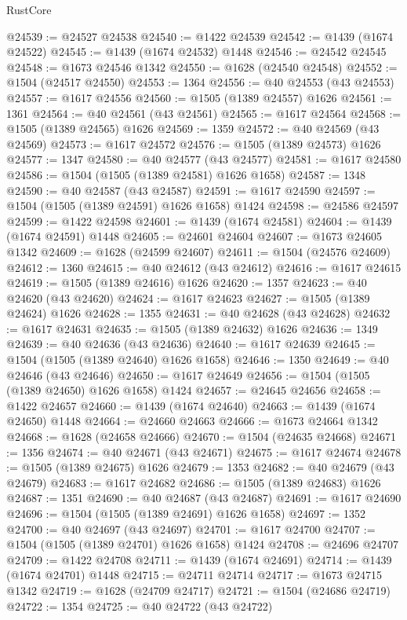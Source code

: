 \begin{lexlean}{RustCore}
\begin{coremodule}
@24539 := @24527 @24538
@24540 := @1422 @24539
@24542 := @1439 (@1674 @24522)
@24545 := @1439 (@1674 @24532) @1448
@24546 := @24542 @24545
@24548 := @1673 @24546 @1342
@24550 := @1628 (@24540 @24548)
@24552 := @1504 (@24517 @24550)
@24553 := 1364
@24556 := @40 @24553 (@43 @24553)
@24557 := @1617 @24556
@24560 := @1505 (@1389 @24557) @1626
@24561 := 1361
@24564 := @40 @24561 (@43 @24561)
@24565 := @1617 @24564
@24568 := @1505 (@1389 @24565) @1626
@24569 := 1359
@24572 := @40 @24569 (@43 @24569)
@24573 := @1617 @24572
@24576 := @1505 (@1389 @24573) @1626
@24577 := 1347
@24580 := @40 @24577 (@43 @24577)
@24581 := @1617 @24580
@24586 := @1504 (@1505 (@1389 @24581) @1626 @1658)
@24587 := 1348
@24590 := @40 @24587 (@43 @24587)
@24591 := @1617 @24590
@24597 := @1504 (@1505 (@1389 @24591) @1626 @1658) @1424
@24598 := @24586 @24597
@24599 := @1422 @24598
@24601 := @1439 (@1674 @24581)
@24604 := @1439 (@1674 @24591) @1448
@24605 := @24601 @24604
@24607 := @1673 @24605 @1342
@24609 := @1628 (@24599 @24607)
@24611 := @1504 (@24576 @24609)
@24612 := 1360
@24615 := @40 @24612 (@43 @24612)
@24616 := @1617 @24615
@24619 := @1505 (@1389 @24616) @1626
@24620 := 1357
@24623 := @40 @24620 (@43 @24620)
@24624 := @1617 @24623
@24627 := @1505 (@1389 @24624) @1626
@24628 := 1355
@24631 := @40 @24628 (@43 @24628)
@24632 := @1617 @24631
@24635 := @1505 (@1389 @24632) @1626
@24636 := 1349
@24639 := @40 @24636 (@43 @24636)
@24640 := @1617 @24639
@24645 := @1504 (@1505 (@1389 @24640) @1626 @1658)
@24646 := 1350
@24649 := @40 @24646 (@43 @24646)
@24650 := @1617 @24649
@24656 := @1504 (@1505 (@1389 @24650) @1626 @1658) @1424
@24657 := @24645 @24656
@24658 := @1422 @24657
@24660 := @1439 (@1674 @24640)
@24663 := @1439 (@1674 @24650) @1448
@24664 := @24660 @24663
@24666 := @1673 @24664 @1342
@24668 := @1628 (@24658 @24666)
@24670 := @1504 (@24635 @24668)
@24671 := 1356
@24674 := @40 @24671 (@43 @24671)
@24675 := @1617 @24674
@24678 := @1505 (@1389 @24675) @1626
@24679 := 1353
@24682 := @40 @24679 (@43 @24679)
@24683 := @1617 @24682
@24686 := @1505 (@1389 @24683) @1626
@24687 := 1351
@24690 := @40 @24687 (@43 @24687)
@24691 := @1617 @24690
@24696 := @1504 (@1505 (@1389 @24691) @1626 @1658)
@24697 := 1352
@24700 := @40 @24697 (@43 @24697)
@24701 := @1617 @24700
@24707 := @1504 (@1505 (@1389 @24701) @1626 @1658) @1424
@24708 := @24696 @24707
@24709 := @1422 @24708
@24711 := @1439 (@1674 @24691)
@24714 := @1439 (@1674 @24701) @1448
@24715 := @24711 @24714
@24717 := @1673 @24715 @1342
@24719 := @1628 (@24709 @24717)
@24721 := @1504 (@24686 @24719)
@24722 := 1354
@24725 := @40 @24722 (@43 @24722)

\end{coremodule}
\end{lexlean}
